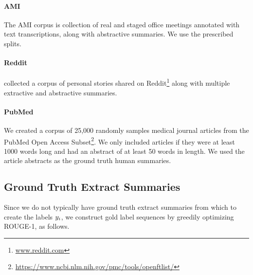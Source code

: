 \paragraph{AMI} The AMI corpus \cite{carletta2005ami} 
is collection of real and staged office meetings
annotated with text transcriptions, along with abstractive
summaries. We use the prescribed splits. 


\paragraph{Reddit} \citet{ouyang2017crowd} collected a corpus of personal 
    stories shared
 on Reddit\footnote{\url{www.reddit.com}} along with multiple extractive 
 and abstractive summaries. %

\paragraph{PubMed}{We created a corpus of 25,000 randomly samples 
    medical journal articles from the PubMed Open Access 
    Subset\footnote{\url{https://www.ncbi.nlm.nih.gov/pmc/tools/openftlist/}}.
    We only included articles if they were at least 1000 words long and 
    had an abstract of at least 50 words in length.
We used the article abstracts as the ground truth human summaries.}

\subsection{Ground Truth Extract Summaries}
Since we do not typically have ground truth extract summaries from which to
create the labels $\slabel_i$, we construct gold label sequences 
by greedily optimizing ROUGE-1, as follows.

